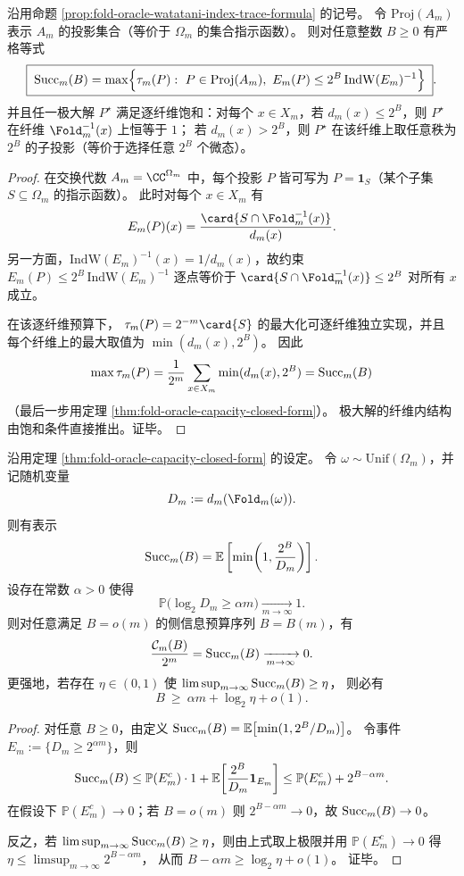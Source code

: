 \begin{proposition}[预算约束下的变分刻画]\label{prop:fold-oracle-variational-projection-characterization}
沿用命题 \ref{prop:fold-oracle-watatani-index-trace-formula} 的记号。
令 \(\mathrm{Proj}(A_m)\) 表示 \(A_m\) 的投影集合（等价于 \(\Omega_m\) 的集合指示函数）。
则对任意整数 \(B\ge 0\) 有严格等式
\[
\boxed{\;
{\rm Succ}_m(B)
=\max\Bigl\{\tau_m(P):\ P\in\mathrm{Proj}(A_m),\ E_m(P)\le 2^B\,\mathrm{IndW}(E_m)^{-1}\Bigr\}\; }.
\]
并且任一极大解 \(P^\star\) 满足逐纤维饱和：对每个 \(x\in X_m\)，若 \(d_m(x)\le 2^B\)，则 \(P^\star\) 在纤维 \(\Fold_m^{-1}(x)\) 上恒等于 \(1\)；
若 \(d_m(x)>2^B\)，则 \(P^\star\) 在该纤维上取任意秩为 \(2^B\) 的子投影（等价于选择任意 \(2^B\) 个微态）。
\end{proposition}
\begin{proof}
在交换代数 \(A_m=\CC^{\Omega_m}\) 中，每个投影 \(P\) 皆可写为 \(P=\mathbf 1_S\)（某个子集 \(S\subseteq\Omega_m\) 的指示函数）。
此时对每个 \(x\in X_m\) 有
\[
E_m(P)(x)=\frac{\card{S\cap \Fold_m^{-1}(x)}}{d_m(x)}.
\]
另一方面，\(\mathrm{IndW}(E_m)^{-1}(x)=1/d_m(x)\)，故约束
\(
E_m(P)\le 2^B\,\mathrm{IndW}(E_m)^{-1}
\)
逐点等价于
\(
\card{S\cap \Fold_m^{-1}(x)}\le 2^B
\)
对所有 \(x\) 成立。
\par
在该逐纤维预算下，
\(
\tau_m(P)=2^{-m}\card{S}
\)
的最大化可逐纤维独立实现，并且每个纤维上的最大取值为 \(\min(d_m(x),2^B)\)。
因此
\[
\max \tau_m(P)
=\frac{1}{2^m}\sum_{x\in X_m}\min(d_m(x),2^B)
={\rm Succ}_m(B)
\]
（最后一步用定理 \ref{thm:fold-oracle-capacity-closed-form}）。
极大解的纤维内结构由饱和条件直接推出。证毕。
\end{proof}

\begin{theorem}[典型纤维指数膨胀下的零比例可恢复性]\label{thm:fold-oracle-capacity-vanishing-under-typical-exponential-fibers}
沿用定理 \ref{thm:fold-oracle-capacity-closed-form} 的设定。
令 \(\omega\sim\mathrm{Unif}(\Omega_m)\)，并记随机变量
\[
D_m:=d_m(\Fold_m(\omega)).
\]
则有表示
\[
{\rm Succ}_m(B)=\mathbb E\left[\min\!\left(1,\frac{2^B}{D_m}\right)\right].
\]
设存在常数 \(\alpha>0\) 使得
\[
\mathbb P\bigl(\log_2 D_m\ge \alpha m\bigr)\xrightarrow[m\to\infty]{}1.
\]
则对任意满足 \(B=o(m)\) 的侧信息预算序列 \(B=B(m)\)，有
\[
\frac{\mathcal C_m(B)}{2^m}={\rm Succ}_m(B)\xrightarrow[m\to\infty]{}0.
\]
更强地，若存在 \(\eta\in(0,1)\) 使
\(
\limsup_{m\to\infty}{\rm Succ}_m(B)\ge \eta
\)，
则必有
\[
B\ \ge\ \alpha m+\log_2\eta+o(1).
\]
\end{theorem}
\begin{proof}
对任意 \(B\ge 0\)，由定义
\(
{\rm Succ}_m(B)=\mathbb E\bigl[\min(1,2^B/D_m)\bigr]
\)。
令事件 \(E_m:=\{D_m\ge 2^{\alpha m}\}\)，则
\[
{\rm Succ}_m(B)
\le \mathbb P(E_m^c)\cdot 1+\mathbb E\!\left[\frac{2^B}{D_m}\mathbf 1_{E_m}\right]
\le \mathbb P(E_m^c)+2^{B-\alpha m}.
\]
在假设下 \(\mathbb P(E_m^c)\to 0\)；若 \(B=o(m)\) 则 \(2^{B-\alpha m}\to 0\)，故 \({\rm Succ}_m(B)\to 0\)。
\par
反之，若 \(\limsup_{m\to\infty}{\rm Succ}_m(B)\ge \eta\)，则由上式取上极限并用 \(\mathbb P(E_m^c)\to 0\) 得
\(
\eta\le \limsup_{m\to\infty}2^{B-\alpha m}
\)，
从而 \(B-\alpha m\ge \log_2\eta+o(1)\)。
证毕。
\end{proof}

